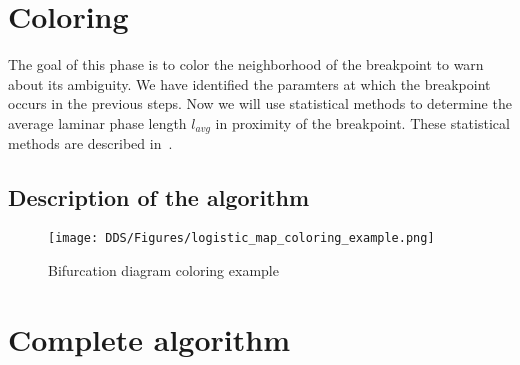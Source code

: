 

\section{Coloring}
The goal of this phase is to color the neighborhood of the breakpoint to warn about its ambiguity.
We have identified the paramters at which the breakpoint occurs in the previous steps.
Now we will use statistical methods to determine the average laminar phase length $l_{avg}$ in proximity of the breakpoint.
These statistical methods are described in~\cite{Elaskar2022}.

\subsection{Description of the algorithm}

\begin{figure}[!h]
    \centering
    \texttt{[image: DDS/Figures/logistic\_map\_coloring\_example.png]}
    \caption{Bifurcation diagram coloring example}
    \label{fig:coloring_example}
\end{figure}

\section{Complete algorithm}

\endinput
